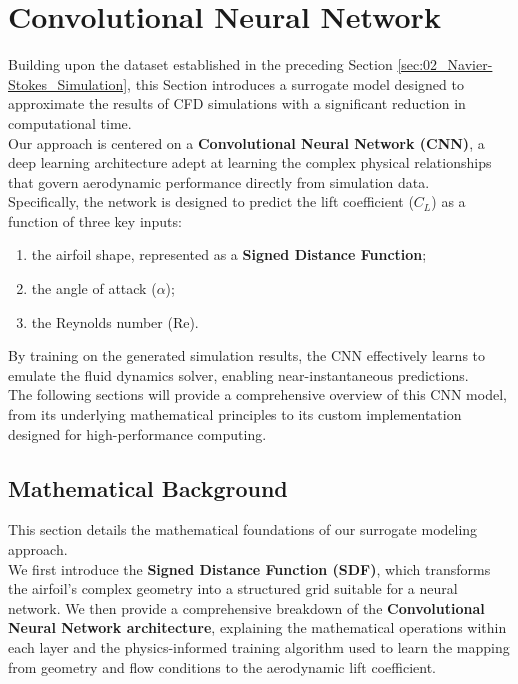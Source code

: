 \section{Convolutional Neural Network}
\label{sec:03_Convolutional_Neural_Network}

Building upon the dataset established in the preceding Section \ref{sec:02_Navier-Stokes_Simulation}, this Section introduces a surrogate model designed to approximate the results of CFD simulations with a significant reduction in computational time.\\

Our approach is centered on a \textbf{Convolutional Neural Network (CNN)}, a deep learning architecture adept at learning the complex physical relationships that govern aerodynamic performance directly from simulation data. \\

Specifically, the network is designed to predict the lift coefficient ($C_L$) as a function of three key inputs: 
\begin{enumerate}
    \item the airfoil shape, represented as a \textbf{Signed Distance Function};
    \item the angle of attack ($\alpha$);
    \item the Reynolds number ($\mathrm{Re}$).
\end{enumerate}
By training on the generated simulation results, the CNN effectively learns to emulate the fluid dynamics solver, enabling near-instantaneous predictions.\\

The following sections will provide a comprehensive overview of this CNN model, from its underlying mathematical principles to its custom implementation designed for high-performance computing.


\subsection{Mathematical Background}

This section details the mathematical foundations of our surrogate modeling approach.\\
We first introduce the \textbf{Signed Distance Function (SDF)}, which transforms the airfoil's complex geometry into a structured grid suitable for a neural network. We then provide a comprehensive breakdown of the \textbf{Convolutional Neural Network architecture}, explaining the mathematical operations within each layer and the physics-informed training algorithm used to learn the mapping from geometry and flow conditions to the aerodynamic lift coefficient.

